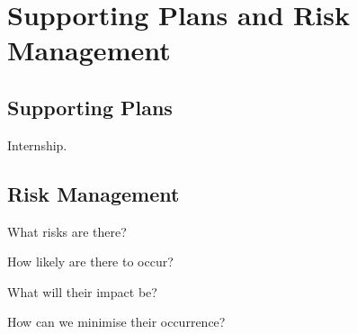 
\section{Supporting Plans and Risk Management}

\subsection{Supporting Plans}

Internship.

\subsection{Risk Management}

What risks are there?

How likely are there to occur?

What will their impact be?

How can we minimise their occurrence?
